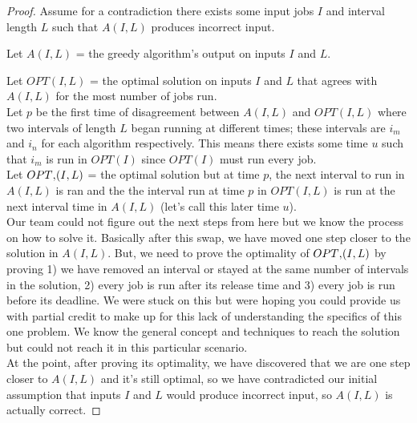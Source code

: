 \documentclass{article}
\begin{document}
	\begin{proof}
		Assume for a contradiction there exists some input jobs $I$ and interval length $L$ such that $A(I, L)$ produces incorrect input.

		Let $A(I, L)$ = the greedy algorithm's output on inputs $I$ and $L$.

		Let $OPT(I, L)$ = the optimal solution on inputs $I$ and $L$ that agrees
		with $A(I, L)$ for the most number of jobs run.\\

		Let $p$ be the first time of disagreement between $A(I, L)$ and $OPT(I, L)$ where two intervals of length $L$ began running at different times; these intervals are $i_m$ and $i_n$ for each algorithm respectively.  This means there exists some time $u$ such that $i_m$ is run in $OPT(I)$ since $OPT(I)$ must run every job.\\

		Let $OPT\textsc{\char13}(I, L)$ = the optimal solution but at time $p$, the next interval to run in $A(I, L)$ is ran and the the interval run at time $p$ in $OPT(I, L)$ is run at the next interval time in $A(I, L)$ (let's call this later time $u$).\\

		Our team could not figure out the next steps from here but we know the process on how to solve it.  Basically after this swap, we have moved one step closer to the solution in $A(I, L)$.  But, we need to prove the optimality of $OPT\textsc{\char13}(I, L)$ by proving 1) we have removed an interval or stayed at the same number of intervals in the solution, 2) every job is run after its release time and 3) every job is run before its deadline.  We were stuck on this but were hoping you could provide us with partial credit to make up for this lack of understanding the specifics of this one problem.  We know the general concept and techniques to reach the solution but could not reach it in this particular scenario.\\

		At the point, after proving its optimality, we have discovered that we are one step closer to $A(I, L)$ and it's still optimal, so we have contradicted our initial assumption that inputs $I$ and $L$ would produce incorrect input, so $A(I, L)$ is actually correct.
	\end{proof}
\end{document}
